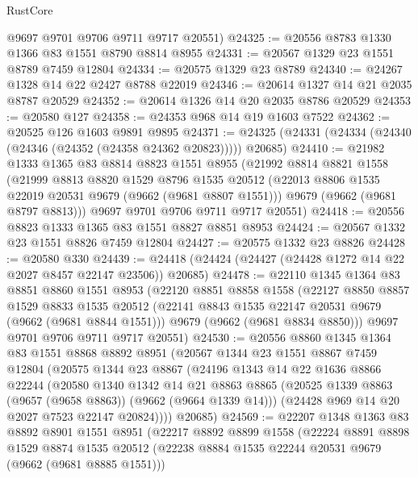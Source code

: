 \begin{lexlean}{RustCore}
\begin{coremodule}
      @9697
      @9701
      @9706
      @9711
      @9717
      @20551)
@24325 := @20556 @8783 @1330 @1366 @83 @1551 @8790 @8814 @8955
@24331 := @20567 @1329 @23 @1551 @8789 @7459 @12804
@24334 := @20575 @1329 @23 @8789
@24340 := @24267 @1328 @14 @22 @2427 @8788 @22019
@24346 := @20614 @1327 @14 @21 @2035 @8787 @20529
@24352 := @20614 @1326 @14 @20 @2035 @8786 @20529
@24353 := @20580 @127
@24358 := @24353 @968 @14 @19 @1603 @7522
@24362 := @20525 @126 @1603 @9891 @9895
@24371 := @24325 (@24331 (@24334 (@24340 (@24346 (@24352 (@24358 @24362 @20823))))) @20685)
@24410 := @21982
    @1333
    @1365
    @83
    @8814
    @8823
    @1551
    @8955
    (@21992
      @8814
      @8821
      @1558
      (@21999
        @8813
        @8820
        @1529
        @8796
        @1535
        @20512
        (@22013 @8806 @1535 @22019 @20531 @9679 (@9662 (@9681 @8807 @1551)))
        @9679
        (@9662 (@9681 @8797 @8813)))
      @9697
      @9701
      @9706
      @9711
      @9717
      @20551)
@24418 := @20556 @8823 @1333 @1365 @83 @1551 @8827 @8851 @8953
@24424 := @20567 @1332 @23 @1551 @8826 @7459 @12804
@24427 := @20575 @1332 @23 @8826
@24428 := @20580 @330
@24439 := @24418 (@24424 (@24427 (@24428 @1272 @14 @22 @2027 @8457 @22147 @23506)) @20685)
@24478 := @22110
    @1345
    @1364
    @83
    @8851
    @8860
    @1551
    @8953
    (@22120
      @8851
      @8858
      @1558
      (@22127
        @8850
        @8857
        @1529
        @8833
        @1535
        @20512
        (@22141 @8843 @1535 @22147 @20531 @9679 (@9662 (@9681 @8844 @1551)))
        @9679
        (@9662 (@9681 @8834 @8850)))
      @9697
      @9701
      @9706
      @9711
      @9717
      @20551)
@24530 := @20556
    @8860
    @1345
    @1364
    @83
    @1551
    @8868
    @8892
    @8951
    (@20567
      @1344
      @23
      @1551
      @8867
      @7459
      @12804
      (@20575
        @1344
        @23
        @8867
        (@24196
          @1343
          @14
          @22
          @1636
          @8866
          @22244
          (@20580
            @1340
            @1342
            @14
            @21
            @8863
            @8865
            (@20525 @1339 @8863 (@9657 (@9658 @8863)) (@9662 (@9664 @1339 @14)))
            (@24428 @969 @14 @20 @2027 @7523 @22147 @20824))))
      @20685)
@24569 := @22207
    @1348
    @1363
    @83
    @8892
    @8901
    @1551
    @8951
    (@22217
      @8892
      @8899
      @1558
      (@22224
        @8891
        @8898
        @1529
        @8874
        @1535
        @20512
        (@22238 @8884 @1535 @22244 @20531 @9679 (@9662 (@9681 @8885 @1551)))

\end{coremodule}
\end{lexlean}
